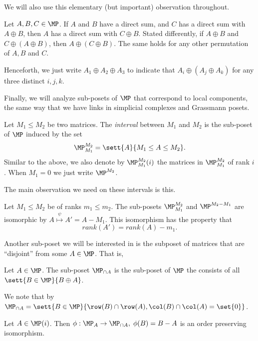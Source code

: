 We will also use this elementary (but important) observation throughout.
\begin{claim} \label{claim:three-term-direct-sum}
    Let \(A,B,C \in \MP\). If \(A\) and \(B\) have a direct sum, and \(C\) has a direct sum with \(A \oplus B\), then \(A\) has a direct sum with \(C \oplus B\). Stated differently, if \(A \oplus B\) and \(C \oplus (A \oplus B)\), then \(A \oplus (C \oplus B)\). The same holds for any other permutation of \(A,B\) and \(C\).
\end{claim}
Henceforth, we just write \(A_1 \oplus A_2 \oplus A_3\) to indicate that \(A_i \oplus (A_j \oplus A_k)\) for any three distinct \(i,j,k\).

Finally, we will analyze sub-posets of \(\MP\) that correspond to local components, the same way that we have links in simplicial complexes and Grassmann posets.
\begin{definition}[Intervals]
    Let \(M_1 \leq M_2\) be two matrices. The \emph{interval} between \(M_1\) and \(M_2\) is the sub-poset of \(\MP\) induced by the set 
    \[\MP_{M_1}^{M_2} = \sett{A}{M_1 \leq A \leq M_2}.\]
    Similar to the above, we also denote by \(\MP_{M_1}^{M_2}(i)\) the matrices in \(\MP_{M_1}^{M_2}\) of rank \(i\). When \(M_1 = 0\) we just write \(\MP^{M_2}\).
\end{definition}

The main observation we need on these intervals is this.
\begin{proposition} \label{prop:iso-of-posets}
    Let \(M_1 \leq M_2\) be of ranks \(m_1 \leq m_2\). The sub-posets \(\MP_{M_1}^{M_2}\) and \(\MP^{M_2-M_1}\) are isomorphic by \(A \overset{\psi}{\mapsto} A' = A - M_1\). This isomorphism has the property that
        \[rank(A') = rank(A) - m_1.\]
\end{proposition}

Another sub-poset we will be interested in is the subposet of matrices that are ``disjoint'' from some \(A \in \MP\). That is,
\begin{definition}
    Let \(A \in \MP\). The sub-poset \(\MP_{\cap A}\) is the sub-poset of \(\MP\) the consists of all \(\sett{B \in \MP}{B \oplus A}\).
\end{definition}
We note that by  \(\MP_{\cap A} = \sett{B \in \MP}{\row(B) \cap \row(A), \col(B) \cap \col(A) = \set{0}}\).
\begin{claim} \label{claim:iso-second-type-of-lower-loc}
    Let \(A \in \MP(i)\). Then \(\phi: \MP_{A} \to \MP_{\cap A}, \; \phi(B)=B-A\) is an order preserving isomorphism.
\end{claim}

